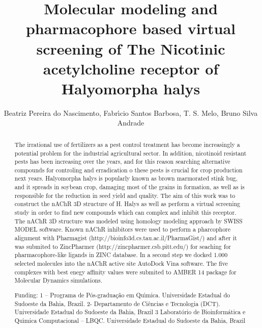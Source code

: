 \documentclass[twoside]{article}
\title{\vspace{-15mm}\fontsize{24pt}{10pt}\selectfont\textbf{ Molecular modeling  and pharmacophore based virtual screening of The Nicotinic acetylcholine receptor of Halyomorpha halys }} %
\author{ Beatriz Pereira do Nascimento, Fabr\'{\i}cio Santos Barbosa, T. S. Melo, Bruno Silva Andrade }
\affil{ Universidade Estadual do Sudoeste da Bahia,  Brazil }
\date{}
\begin{document}
  
  
  \maketitle %
  
  
  \thispagestyle{fancy} %
  
  
  \begin{abstract}
  The irrational use of fertilizers as a pest control treatment has become increasingly a potential problem for the industrial agricultural sector. In addition,  nicotinoid resistant pests has been increasing over the years,  and for this reason searching alternative compounds for controling and erradication o these pests is crucial for crop production next years. Halyomorpha halys is popularly known as brown marmorated stink bug,  and it spreads in soybean crop,  damaging most of the grains in formation,  as well as is responsible for the reduction in seed yield and quality. The aim of this work was to construct the nAChR 3D structure of H. Halys as well as perform a virtual screening study in order to find new compounds which can complex and inhibit this receptor. The nAChR 3D structure was modeled using homology modeling approach by SWISS MODEL software. Known nAChR inhibitors were used to perform a pharcophore alignment with Pharmagist (http://bioinfo3d.cs.tau.ac.il/PharmaGist/) and after it was submited to ZincPharmer (http://zincpharmer.csb.pitt.edu/) for seaching for pharmacophore-like ligands in ZINC database. In a second step we docked 1.000 selected molecules into the nAChR active site AutoDock Vina software. The five complexes with best enegy affinity values were submited to AMBER 14 package for Molecular Dynamics simulations.
  
  Funding: 1 – Programa de P\'os-gradua\c{c}\~ao em Qu\'{\i}mica. Universidade Estadual do Sudoeste da Bahia,  Brazil. 2- Departamento de Ci\^encias e Tecnologia (DCT). Universidade Estadual do Sudoeste da Bahia,  Brazil 3 Laborat\'orio de Bioinform\'atica e Qu\'{\i}mica Computacional – LBQC. Universidade Estadual do Sudoeste da Bahia,  Brazil \\ 
  \end{abstract}
  
\end{document}
